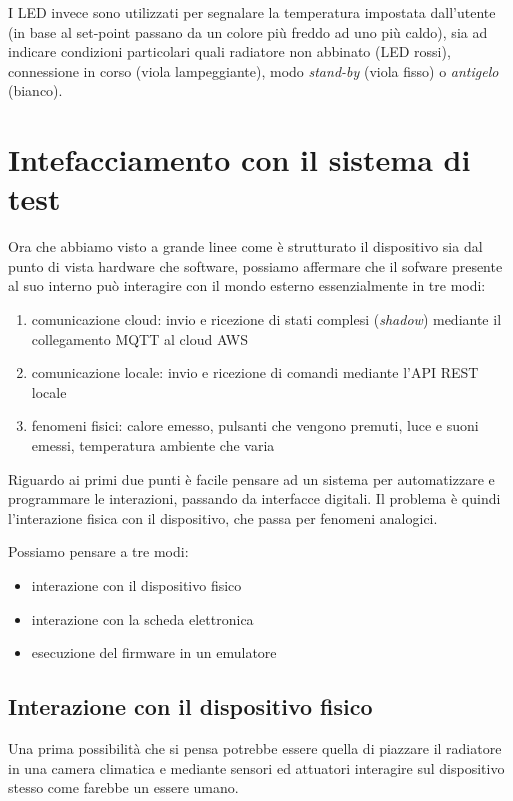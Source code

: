 \documentclass[12pt,a4paper,twoside,titlepage]{book}
\begin{document}
I LED invece sono utilizzati per segnalare la temperatura impostata dall'utente
(in base al set-point passano da un colore più freddo ad uno più caldo), sia ad
indicare condizioni particolari quali radiatore non abbinato (LED rossi), connessione
in corso (viola lampeggiante), modo \textit{stand-by} (viola fisso) o \textit{antigelo} (bianco).

\section{Intefacciamento con il sistema di test}

Ora che abbiamo visto a grande linee come è strutturato il dispositivo sia dal punto
di vista hardware che software, possiamo affermare che il sofware presente al suo interno
può interagire con il mondo esterno essenzialmente in tre modi:

\begin{enumerate}
    \item comunicazione cloud: invio e ricezione di stati complesi (\textit{shadow})
        mediante il collegamento MQTT al cloud AWS
    \item comunicazione locale: invio e ricezione di comandi mediante l'API REST locale
    \item fenomeni fisici: calore emesso, pulsanti che vengono premuti, luce e suoni
        emessi, temperatura ambiente che varia
\end{enumerate}

Riguardo ai primi due punti è facile pensare ad un sistema per automatizzare e programmare
le interazioni, passando da interfacce digitali. Il problema è quindi l'interazione fisica
con il dispositivo, che passa per fenomeni analogici.

Possiamo pensare a tre modi:

\begin{itemize}
    \item interazione con il dispositivo fisico
    \item interazione con la scheda elettronica
    \item esecuzione del firmware in un emulatore
\end{itemize}

\subsection{Interazione con il dispositivo fisico}

Una prima possibilità che si pensa potrebbe essere quella di piazzare il radiatore in una camera
climatica e mediante sensori ed attuatori interagire sul dispositivo stesso come farebbe
un essere umano.
\end{document}
